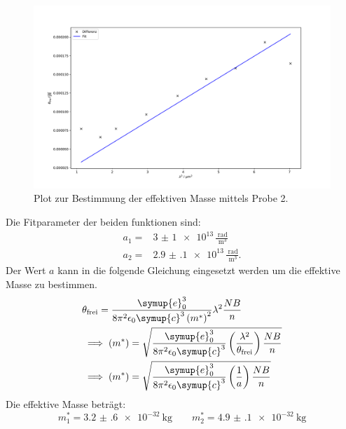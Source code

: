 \begin{figure}
  \centering
  \includegraphics[width = \textwidth]{figure/Theta2_diff_plot.pdf}
  \caption{Plot zur Bestimmung der effektiven Masse mittels Probe 2.}
  \label{fig:fit2}
\end{figure}
\FloatBarrier
Die Fitparameter der beiden funktionen sind:
\begin{align*}
  a_{\text{1}} =& \num{3(1)e13}  \,\frac{\SI{}{\radian}}{\SI{}{\cubic\meter}}\\
  a_{\text{2}} =& \num{2.9(1)e13}\,\frac{\SI{}{\radian}}{\SI{}{\cubic\meter}}.
\end{align*}
Der Wert $a$ kann in die folgende Gleichung eingesetzt werden um die effektive Masse zu bestimmen.
\begin{align*}
  &\theta_{\text{frei}} = \frac{\symup{e}_0^3}{8\pi^2\epsilon_0\symup{c}^3 \left(m^*\right)^2}\lambda^2\frac{NB}{n}\\
  &\implies \left(m^*\right)=\sqrt{\frac{\symup{e}_0^3}{8\pi^2\epsilon_0\symup{c}^3} \left(\frac{\lambda^2}{\theta_{\text{frei}}}\right)\frac{NB}{n} }\\
  &\implies \left(m^*\right)=\sqrt{\frac{\symup{e}_0^3}{8\pi^2\epsilon_0\symup{c}^3} \left(\frac{1}{a}\right)\frac{NB}{n} }
\end{align*}
Die effektive Masse beträgt:
\begin{equation*}
  m^*_1 = \SI{3.2(6)e-32}{\kilo\gram}\qquad m^*_2 = \SI{4.9(1)e-32}{\kilo\gram}
\end{equation*}